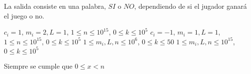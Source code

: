 \documentclass{oci}
\begin{document}
\begin{outputDescription}
La salida consiste en una palabra, $SI$ o $NO$, dependiendo de si el jugador ganará el juego o no.
\end{outputDescription}

\begin{scoreDescription}
   $c_i=1$, $m_i=2, L=1$, $1\leq n \leq 10^{15}$, $0\leq k\leq 10^5$
   $c_i=-1$, $m_i=1, L=1$, $1\leq n \leq 10^{15}$, $0\leq k\leq 10^5$
   $1\leq m_i, L, n\leq 10^{6}$, $0\leq k\leq 50$
   $1\leq m_i, L, n\leq 10^{15}$, $0\leq k\leq 10^5$
\end{scoreDescription}
Siempre se cumple que $0\leq x<n$
\begin{sampleDescription}
\end{sampleDescription}
\end{document}
